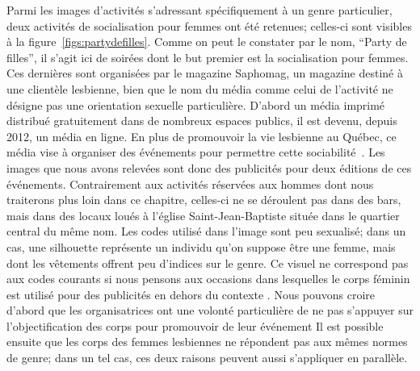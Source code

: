 Parmi les images d'activités s'adressant spécifiquement à un genre particulier, deux activités de socialisation pour femmes ont été retenues; celles-ci sont visibles à la figure~\ref{figs:partydefilles}.
Comme on peut le constater par le nom, \enquote{Party de filles}, il s'agit ici de soirées dont le but premier est la socialisation pour femmes.
Ces dernières sont organisées par le magazine Saphomag, un magazine destiné à une clientèle lesbienne, bien que le nom du média comme celui de l'activité ne désigne pas une orientation sexuelle particulière.
D'abord un média imprimé distribué gratuitement dans de nombreux espaces publics, il est devenu, depuis 2012, un média en ligne.
En plus de promouvoir la vie lesbienne au Québec, ce média vise à organiser des événements pour permettre cette sociabilité~\citep{Saphomag2016}.
Les images que nous avons relevées sont donc des publicités pour deux éditions de ces événements.
Contrairement aux activités réservées aux hommes dont nous traiterons plus loin dans ce chapitre, celles-ci ne se déroulent pas dans des bars, mais dans des locaux loués à l'église Saint-Jean-Baptiste située dans le quartier central du même nom.
Les codes utilisé dans l'image sont peu sexualisé; dans un cas, une silhouette représente un individu qu'on suppose être une femme, mais dont les vêtements offrent peu d'indices sur le genre.
Ce visuel ne correspond pas aux codes courants si nous pensons aux occasions dans lesquelles le corps féminin est utilisé pour des publicités en dehors du contexte \lgbt{}.
Nous pouvons croire d'abord que les organisatrices ont une volonté particulière de ne pas s'appuyer sur l'objectification des corps pour promouvoir de leur événement
Il est possible ensuite que les corps des femmes lesbiennes ne répondent pas aux mêmes normes de genre; dans un tel cas, ces deux raisons peuvent aussi s'appliquer en parallèle.

